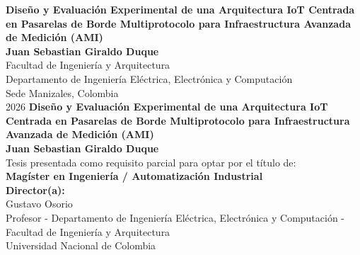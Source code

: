 \documentclass[10pt,spanish,fleqn,openany,twoside,letterpaper]{book}
\newcommand{\studentname}{}
\newcommand{\academictitle}{}
\newcommand{\thesisname}{}
\newcommand{\director}{}
\newcommand{\directortitle}{}
\newcommand{\codirector}{} %
\newcommand{\issuedate}{}
\newcommand{\sede}{}
\newcommand{\department}{}
\newcommand{\departmenttwo}{} %
\newcommand{\faculty}{}
\newcommand{\university}{Universidad Nacional de Colombia}
\renewcommand{\studentname}{Juan Sebastian Giraldo Duque}
\renewcommand{\thesisname}{Diseño y Evaluación Experimental de una Arquitectura IoT Centrada en Pasarelas de Borde Multiprotocolo para Infraestructura Avanzada de Medición (AMI)}
\renewcommand{\issuedate}{2026}
\renewcommand{\director}{Gustavo Osorio}
\renewcommand{\directortitle}{Profesor - Departamento de Ingeniería Eléctrica, Electrónica y Computación}
\renewcommand{\codirector}{} %
\renewcommand{\academictitle}{Magíster en Ingeniería / Automatización Industrial}
\renewcommand{\sede}{Sede Manizales}
\renewcommand{\department}{Departamento de Ingeniería Eléctrica, Electrónica y Computación}
\renewcommand{\faculty}{Facultad de Ingeniería y Arquitectura}
\begin{document}
\renewcommand{\listfigurename}{\sffamily Lista de figuras}
\renewcommand{\listtablename}{\sffamily Lista de tablas}
\renewcommand{\contentsname}{\sffamily Contenido}
\renewcommand{\chaptername}{\sffamily Capítulo}
\renewcommand{\tablename}{\scriptsize \centering \textbf{Tabla}}
\renewcommand{\figurename}{\scriptsize \centering \textbf{Figura}}
\renewcommand{\appendixname}{\sffamily Anexo}

\renewcommand{\bibname}{\sffamily Referencias Bibliográficas}

{\newpage
\thispagestyle{empty}
\begin{center}
\begin{figure}
\centering
{}%
\end{figure}
\vspace{2.5cm}
\textbf{\LARGE \thesisname} \\ 
\vspace{2.5cm}
\textbf{\Large \studentname} \\
\vspace{5.0cm}
\faculty \\ \department \\
\sede, Colombia\\
\issuedate
\newpage 
\thispagestyle{empty}
\vspace{2.0cm}
\textbf{\huge \thesisname} \\
\vspace{2.0cm}
\textbf{\Large \studentname} \\
\vspace{2.0cm}
\small Tesis presentada como requisito parcial para optar por el título de: \\
{\bfseries \academictitle}\\
\vspace{2.0cm}
\textbf{Director(a):} \\
\director \\
\directortitle \; - \departmenttwo \\
\faculty \\
\university \\ 
\vspace{1.5cm}

\end{center}}
\end{document}
